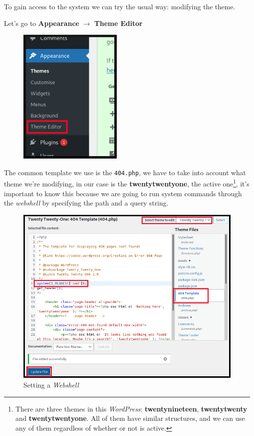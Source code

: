 \documentclass[12pt]{article}
\begin{document}
    To gain access to the system we can try the usual way: modifying the theme.

    Let's go to \textbf{Appearance} $\rightarrow$ \textbf{Theme Editor}

    \begin{figure}[H]\label{pic:34-wp-theme-editor}
        \centering
        \includegraphics[width=0.45\textwidth]{34-wp-theme-editor.png}
    \end{figure}

    The common template we use is the \texttt{404.php}, we have to take into
    account what theme we're modifying, in our case is the
    \textbf{twentytwentyone}, the active one\footnote{There are three themes in
    this \textit{WordPress}: \textbf{twentynineteen}, \textbf{twentytwenty} and
    \textbf{twentytwentyone}. All of them have similar structures, and we can
    use any of them regardless of whether or not is active.}, it's important to
    know this because we are going to run system commands through the
    \textit{webshell} by specifying the path and a query string.

    \begin{figure}[H]\label{pic:35-wp-webshell}
        \centering
        \includegraphics[width=1.00\textwidth]{35-wp-webshell-gimp.png}
        \caption{Setting a \textit{Webshell}}
    \end{figure}
\end{document}
